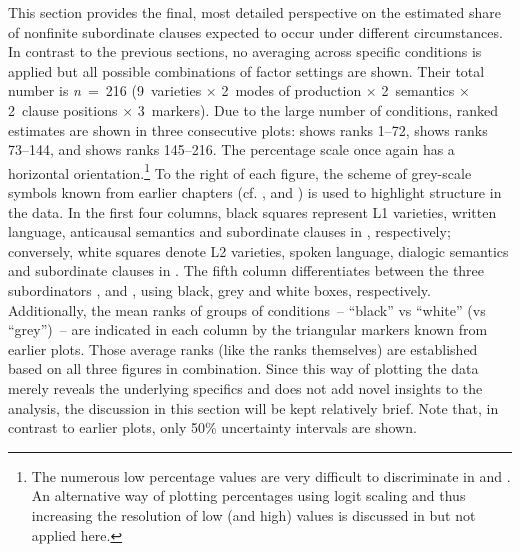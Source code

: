 This section provides the final, most detailed perspective on the estimated share of nonfinite subordinate clauses expected to occur under different circumstances. In contrast to the previous sections, no averaging across specific conditions is applied but all possible combinations of factor settings are shown. Their total number is \textit{n}~=~216 (9~varieties × 2~modes of production × 2~semantics × 2~clause positions × 3~markers). Due to the large number of conditions, ranked estimates are shown in three consecutive plots:  shows ranks 1–72,  shows ranks 73–144, and  shows ranks 145–216. The percentage scale once again has a horizontal orientation.{\footnote{The numerous low percentage values are very difficult to discriminate in  and . An alternative way of plotting percentages using logit scaling and thus increasing the resolution of low (and high) values is discussed in \citet{Schützler2023} but not applied here.}} To the right of each figure, the scheme of grey-scale symbols known from earlier chapters (cf. ,  and ) is used to highlight structure in the data. In the first four columns, black squares represent L1 varieties, written language, anticausal semantics and subordinate clauses in , respectively; conversely, white squares denote L2 varieties, spoken language, dialogic semantics and subordinate clauses in . The fifth column differentiates between the three subordinators ,  and , using black, grey and white boxes, respectively. Additionally, the mean ranks of groups of conditions~– “black” vs “white” (vs “grey”)~– are indicated in each column by the triangular markers known from earlier plots. Those average ranks (like the ranks themselves) are established based on all three figures in combination. Since this way of plotting the data merely reveals the underlying specifics and does not add novel insights to the analysis, the discussion in this section will be kept relatively brief. Note that, in contrast to earlier plots, only 50\% uncertainty intervals are shown.

